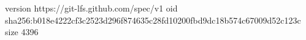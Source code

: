 version https://git-lfs.github.com/spec/v1
oid sha256:b018e4222cf3c2523d296f874635c28fd10200fbd9dc18b574c67009d52c123c
size 4396
